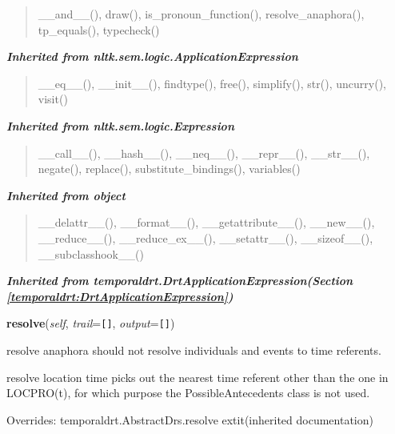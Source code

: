 \begin{quote}
\_\_and\_\_(), draw(), is\_pronoun\_function(), resolve\_anaphora(), tp\_equals(), typecheck()
\end{quote}

\large{\textbf{\textit{Inherited from nltk.sem.logic.ApplicationExpression}}}

\begin{quote}
\_\_eq\_\_(), \_\_init\_\_(), findtype(), free(), simplify(), str(), uncurry(), visit()
\end{quote}

\large{\textbf{\textit{Inherited from nltk.sem.logic.Expression}}}

\begin{quote}
\_\_call\_\_(), \_\_hash\_\_(), \_\_neq\_\_(), \_\_repr\_\_(), \_\_str\_\_(), negate(), replace(), substitute\_bindings(), variables()
\end{quote}

\large{\textbf{\textit{Inherited from object}}}

\begin{quote}
\_\_delattr\_\_(), \_\_format\_\_(), \_\_getattribute\_\_(), \_\_new\_\_(), \_\_reduce\_\_(), \_\_reduce\_ex\_\_(), \_\_setattr\_\_(), \_\_sizeof\_\_(), \_\_subclasshook\_\_()
\end{quote}

\large{\textbf{\textit{Inherited from temporaldrt.DrtApplicationExpression\textit{(Section \ref{temporaldrt:DrtApplicationExpression})}}}}

    \vspace{0.5ex}

\hspace{.8\funcindent}\begin{boxedminipage}{\funcwidth}

    \raggedright \textbf{resolve}(\textit{self}, \textit{trail}={\tt \texttt{[}\texttt{]}}, \textit{output}={\tt \texttt{[}\texttt{]}})

\setlength{\parskip}{2ex}
    resolve anaphora should not resolve individuals and events to time 
    referents.

    resolve location time picks out the nearest time referent other than 
    the one in LOCPRO(t), for which purpose the PossibleAntecedents class 
    is not used.

\setlength{\parskip}{1ex}
      Overrides: temporaldrt.AbstractDrs.resolve 	extit{(inherited documentation)}

    \end{boxedminipage}


